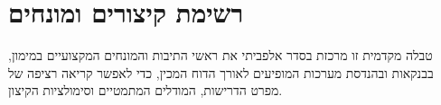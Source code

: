 \documentclass[12pt,a4paper,oneside]{book}
\begin{document}
\tableofcontents
\listoffigures
\listoftables

\chapter*{רשימת קיצורים ומונחים}

טבלה מקדמית זו מרכזת בסדר אלפביתי את ראשי התיבות והמונחים המקצועיים במימון, בבנקאות ובהנדסת מערכות המופיעים לאורך הדוח המכין, כדי לאפשר קריאה רציפה של מפרט הדרישות, המודלים המתמטיים וסימולציות הקיצון.
\end{document}

